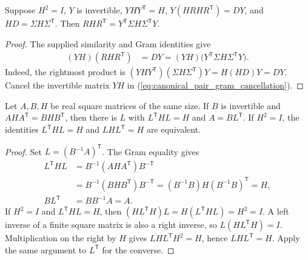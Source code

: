 \begin{theorem}
    \label{thm:gram_of_normalized_similarity}
    \leanok
    Suppose $H^2=I$, $Y$ is invertible, $YHY^{\mathsf T}=H$,
    $Y(HRHR^{\mathsf T})=DY$, and $HD=\Sigma H\Sigma^{\mathsf T}$.
    Then $RHR^{\mathsf T}=Y^{\mathsf T}\Sigma H\Sigma^{\mathsf T}Y$.
\end{theorem}
\begin{proof}\leanok
    The supplied similarity and Gram identities give
    \begin{align}
        (YH)(RHR^{\mathsf T})&=DY
        =(YH)\bigl(Y^{\mathsf T}\Sigma H\Sigma^{\mathsf T}Y\bigr).
        \label{eq:canonical_pair_gram_cancellation}
    \end{align}
    Indeed, the rightmost product is
    $(YHY^{\mathsf T})(\Sigma H\Sigma^{\mathsf T})Y=H(HD)Y=DY$.
    Cancel the invertible matrix $YH$ in
    (\ref{eq:canonical_pair_gram_cancellation}).
\end{proof}

\begin{theorem}
    \label{thm:right_isometry_invertible_gram}
    \leanok
    Let $A,B,H$ be real square matrices of the same size. If $B$ is
    invertible and $AHA^{\mathsf T}=BHB^{\mathsf T}$, then there is $L$
    with $L^{\mathsf T}HL=H$ and $A=BL^{\mathsf T}$.
    If $H^2=I$, the identities $L^{\mathsf T}HL=H$ and
    $LHL^{\mathsf T}=H$ are equivalent.
\end{theorem}
\begin{proof}\leanok
    Set $L=(B^{-1}A)^{\mathsf T}$. The Gram equality gives
    \begin{align*}
        L^{\mathsf T}HL
        &=B^{-1}(AHA^{\mathsf T})B^{-\mathsf T}\\
        &=B^{-1}(BHB^{\mathsf T})B^{-\mathsf T}
          =(B^{-1}B)H(B^{-1}B)^{\mathsf T}=H,\\
        BL^{\mathsf T}&=BB^{-1}A=A.
    \end{align*}
    If $H^2=I$ and $L^{\mathsf T}HL=H$, then
    $(HL^{\mathsf T}H)L=H(L^{\mathsf T}HL)=H^2=I$.
    A left inverse of a finite square matrix is also a right inverse,
    so $L(HL^{\mathsf T}H)=I$. Multiplication on the right by $H$ gives
    $LHL^{\mathsf T}H^2=H$, hence $LHL^{\mathsf T}=H$.
    Apply the same argument to $L^{\mathsf T}$ for the converse.
\end{proof}

